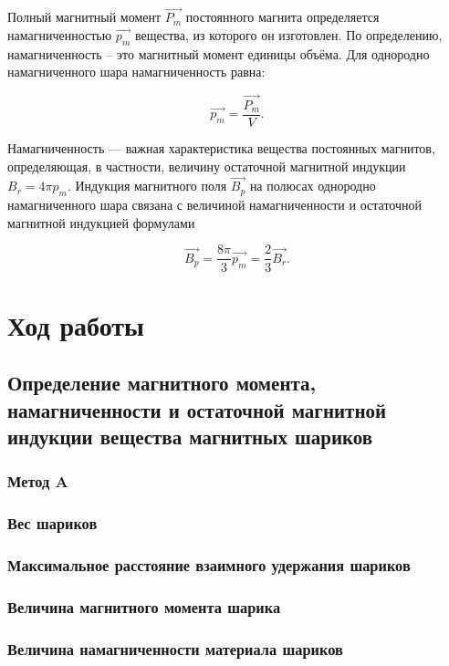 \documentclass[a4paper, 12pt]{article}
\begin{document}
            Полный магнитный момент $\overrightarrow{P_m}$ постоянного магнита определяется намагниченностью $\overrightarrow{p_m}$ вещества, из которого он изготовлен. По определению, намагниченность – это магнитный момент единицы объёма. Для однородно намагниченного шара намагниченность равна:

            $$
            \overrightarrow{p_m}=\dfrac{\overrightarrow{P_m}}{V}.
            $$

            Намагниченность — важная характеристика вещества постоянных магнитов, определяющая, в частности, величину остаточной магнитной индукции $B_r = 4\pi p_m$. Индукция магнитного поля $\overrightarrow{B_p}$ на полюсах однородно намагниченного шара связана с величиной намагниченности и остаточной магнитной индукцией формулами

            $$
            \overrightarrow{B_p}=\dfrac{8\pi}{3}\overrightarrow{p_m}=\dfrac{2}{3}\overrightarrow{B_r}.
            $$

    \section{Ход работы}

        \subsection{Определение магнитного момента, намагниченности и остаточной магнитной индукции вещества магнитных шариков}
            \subsubsection*{\textbf{Метод A}}
            \subsubsection{Вес шариков}



            \subsubsection{Максимальное расстояние взаимного удержания шариков}


            \subsubsection{Величина магнитного момента шарика}


            \subsubsection{Величина намагниченности материала шариков}
\end{document}
